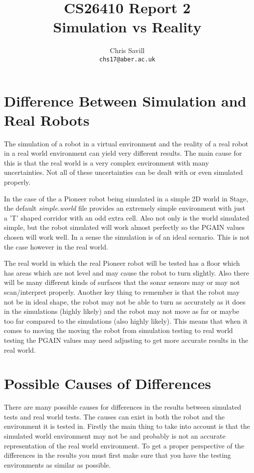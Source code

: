 \documentclass[a4paper,12pt]{article}
\title{CS26410 Report 2\\
Simulation vs Reality}
\author{Chris Savill\\\texttt{chs17@aber.ac.uk}}
\begin{document}
\maketitle
\newpage
\tableofcontents
\newpage

\section{Difference Between Simulation and Real Robots}
The simulation of a robot in a virtual environment and the reality of a real robot in a real world environment can yield very different results. The main cause for this is that the real world is a very complex environment with many uncertainties. Not all of these uncertainties can be dealt with or even simulated properly.

\vspace{5mm}
\noindent In the case of the a Pioneer robot being simulated in a simple 2D world in Stage, the default \textit{simple.world} file provides an extremely simple environment with just a 'T' shaped corridor with an odd extra cell. Also not only is the world simulated simple, but the robot simulated will work almost perfectly so the PGAIN values chosen will work well. In a sense the simulation is of an ideal scenario. This is not the case however in the real world.

\vspace{5mm}
\noindent The real world in which the real Pioneer robot will be tested has a floor which has areas which are not level and may cause the robot to turn slightly. Also there will be many different kinds of surfaces that the sonar sensors may or may not scan/interpret properly. Another key thing to remember is that the robot may not be in ideal shape, the robot may not be able to turn as accurately as it does in the simulations (highly likely) and the robot may not move as far or maybe too far compared to the simulations (also highly likely). This means that when it comes to moving the moving the robot from simulation testing to real world testing the PGAIN values may need adjusting to get more accurate results in the real world.

\vspace{5mm}
\noindent 
\section{Possible Causes of Differences}

\noindent There are many possible causes for differences in the results between simulated tests and real world tests. The causes can exist in both the robot and the environment it is tested in. Firstly the main thing to take into account is that the simulated world environment may not be and probably is not an accurate representation of the real world environment. To get a proper perspective of the differences in the results you must first make sure that you have the testing environments as similar as possible.
\end{document}
